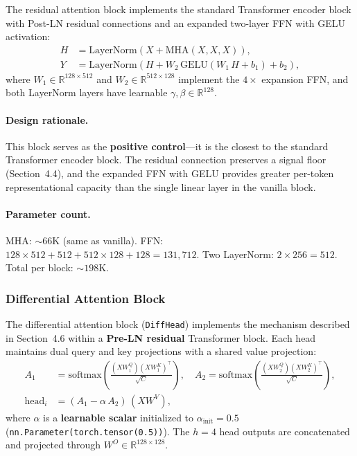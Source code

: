 \documentclass[12pt, a4paper]{article}
\begin{document}
The residual attention block implements the standard Transformer encoder
block with Post-LN residual connections and an expanded two-layer FFN
with GELU activation:
\begin{align}
    H &= \text{LayerNorm}\!\left(X + \text{MHA}(X, X, X)\right),
    \label{eq:res_mha} \\
    Y &= \text{LayerNorm}\!\left(H + W_2\,
        \text{GELU}(W_1\, H + b_1) + b_2\right),
    \label{eq:res_ff}
\end{align}
where $W_1 \in \mathbb{R}^{128 \times 512}$ and
$W_2 \in \mathbb{R}^{512 \times 128}$ implement the $4\times$ expansion
FFN, and both LayerNorm layers have learnable $\gamma, \beta \in
\mathbb{R}^{128}$.

\paragraph{Design rationale.}
This block serves as the \textbf{positive control}---it is the closest
to the standard Transformer encoder block. The residual connection
preserves a signal floor (Section~4.4), and the expanded FFN with GELU
provides greater per-token representational capacity than the single
linear layer in the vanilla block.

\paragraph{Parameter count.}
MHA: ${\sim}66$K (same as vanilla). FFN: $128 \times 512 + 512 +
512 \times 128 + 128 = 131{,}712$. Two LayerNorm: $2 \times 256 = 512$.
Total per block: ${\sim}198$K.

\subsubsection{Differential Attention Block}

The differential attention block (\texttt{DiffHead}) implements the
mechanism described in Section~4.6 within a \textbf{Pre-LN residual}
Transformer block. Each head maintains dual query and key projections
with a shared value projection:
\begin{align}
    A_1 &= \text{softmax}\!\left(\frac{(XW_1^Q)(XW_1^K)^\top}
           {\sqrt{C}}\right), \quad
    A_2 = \text{softmax}\!\left(\frac{(XW_2^Q)(XW_2^K)^\top}
           {\sqrt{C}}\right), \label{eq:impl_diff_maps} \\
    \text{head}_i &= (A_1 - \alpha\, A_2)\, (X W^V),
    \label{eq:impl_diff_out}
\end{align}
where $\alpha$ is a \textbf{learnable scalar} initialized to
$\alpha_{\text{init}} = 0.5$ (\texttt{nn.Parameter(torch.tensor(0.5))}).
The $h = 4$ head outputs are concatenated and projected through
$W^O \in \mathbb{R}^{128 \times 128}$.
\end{document}
